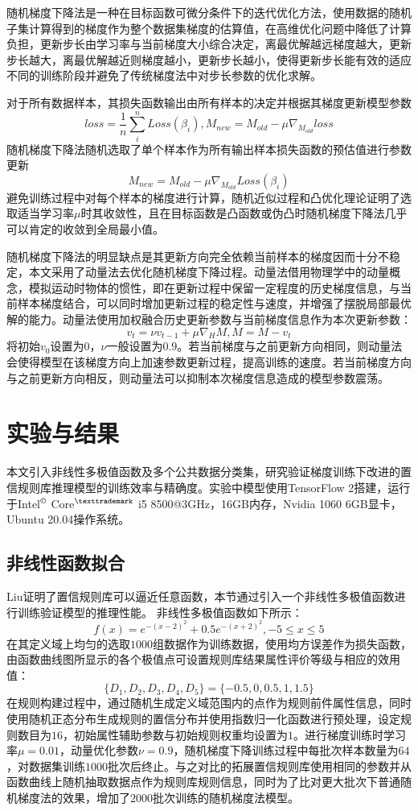 \documentclass{cjc}
\begin{document}
随机梯度下降法\cite{a17}是一种在目标函数可微分条件下的迭代优化方法，使用数据的随机子集计算得到的梯度作为整个数据集梯度的估算值，在高维优化问题中降低了计算负担，更新步长由学习率与当前梯度大小综合决定，离最优解越远梯度越大，更新步长越大，离最优解越近则梯度越小，更新步长越小，使得更新步长能有效的适应不同的训练阶段并避免了传统梯度法中对步长参数的优化求解。
  
对于所有数据样本，其损失函数输出由所有样本的决定并根据其梯度更新模型参数
$$loss=\frac{1}{n}\sum_i^nLoss(\beta_i),M_{new}=M_{old}-\mu\nabla_{M_{old}}loss$$
随机梯度下降法随机选取了单个样本作为所有输出样本损失函数的预估值进行参数更新
$$M_{new}=M_{old}-\mu\nabla_{M_{old}}Loss(\beta_i)$$
避免训练过程中对每个样本的梯度进行计算，随机近似过程和凸优化理论\cite{a18}证明了选取适当学习率$\mu$时其收敛性，且在目标函数是凸函数或伪凸时随机梯度下降法几乎可以肯定的收敛到全局最小值。

随机梯度下降法的明显缺点是其更新方向完全依赖当前样本的梯度因而十分不稳定，本文采用了动量法\cite{a19}去优化随机梯度下降过程。动量法借用物理学中的动量概念，模拟运动时物体的惯性，即在更新过程中保留一定程度的历史梯度信息，与当前样本梯度结合，可以同时增加更新过程的稳定性与速度，并增强了摆脱局部最优解的能力。动量法使用加权融合历史更新参数与当前梯度信息作为本次更新参数：
$$v_t=\nu v_{t-1}+\mu\nabla_HM,M=M-v_t$$
将初始$v_0$设置为$0$，$\nu$一般设置为$0.9$。若当前梯度与之前更新方向相同，则动量法会使得模型在该梯度方向上加速参数更新过程，提高训练的速度。若当前梯度方向与之前更新方向相反，则动量法可以抑制本次梯度信息造成的模型参数震荡。
\section{实验与结果}
本文引入非线性多极值函数及多个公共数据分类集，研究验证梯度训练下改进的置信规则库推理模型的训练效率与精确度。实验中模型使用TensorFlow 2搭建，运行于Intel$^{\copyright}$ Core$^{\texttrademark}$ i5 8500@3GHz，16GB内存，Nvidia 1060 6GB显卡，Ubuntu 20.04操作系统。
\subsection{非线性函数拟合}
Liu\cite{a15}证明了置信规则库可以逼近任意函数，本节通过引入一个非线性多极值函数进行训练验证模型的推理性能。  
非线性多极值函数如下所示：
$$f(x)=e^{-(x-2)^2}+0.5e^{-(x+2)^2},-5\leq x\leq 5$$
在其定义域上均匀的选取$1000$组数据作为训练数据，使用均方误差作为损失函数，由函数曲线图所显示的各个极值点可设置规则库结果属性评价等级与相应的效用值：
$$\{D_1,D_2,D_3,D_4,D_5\}=\{-0.5,0,0.5,1,1.5\}$$
在规则构建过程中，通过随机生成定义域范围内的点作为规则前件属性信息，同时使用随机正态分布生成规则的置信分布并使用指数归一化函数进行预处理，设定规则数目为$16$，初始属性辅助参数与初始规则权重均设置为$1$。进行梯度训练时学习率$\mu=0.01$，动量优化参数$\nu=0.9$，随机梯度下降训练过程中每批次样本数量为$64$，对数据集训练$1000$批次后终止。与之对比的拓展置信规则库使用相同的参数并从函数曲线上随机抽取数据点作为规则库规则信息，同时为了比对更大批次下普通随机梯度法的效果，增加了$2000$批次训练的随机梯度法模型。
\end{document}
